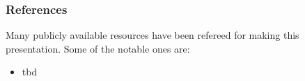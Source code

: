 \begin{frame}\frametitle{References}
Many publicly available resources have been refereed for making this presentation. Some of the notable ones are:
\footnotesize
\begin{itemize}
\item tbd
\end{itemize}

\end{frame}